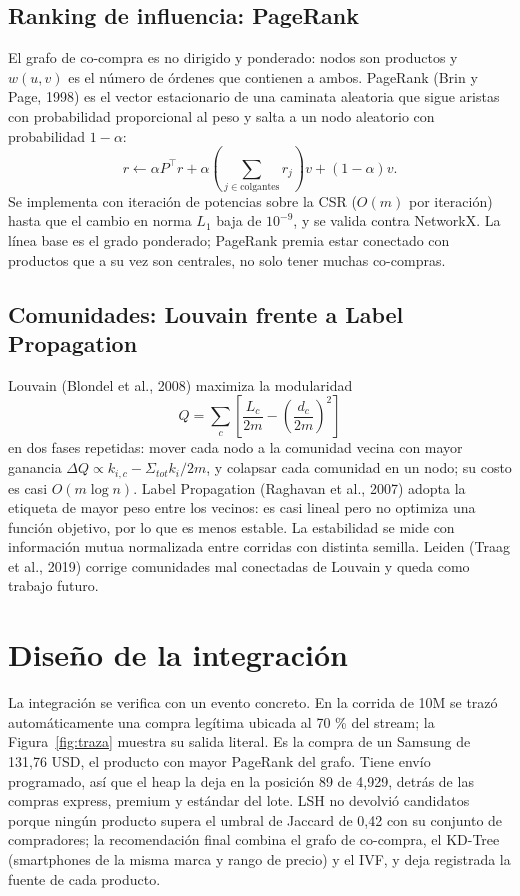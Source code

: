 \documentclass[11pt,letterpaper]{article}
\begin{document}
\subsection{Ranking de influencia: PageRank}
El grafo de co-compra es no dirigido y ponderado: nodos son productos y $w(u,v)$ es el n\'umero de \'ordenes que contienen a ambos. PageRank (Brin y Page, 1998) es el vector estacionario de una caminata aleatoria que sigue aristas con probabilidad proporcional al peso y salta a un nodo aleatorio con probabilidad $1-\alpha$:
\begin{equation}
r \leftarrow \alpha P^{\top} r + \alpha\left(\sum_{j \in \text{colgantes}} r_j\right) v + (1-\alpha)v .
\end{equation}
Se implementa con iteraci\'on de potencias sobre la CSR ($O(m)$ por iteraci\'on) hasta que el cambio en norma $L_1$ baja de $10^{-9}$, y se valida contra NetworkX. La l\'inea base es el grado ponderado; PageRank premia estar conectado con productos que a su vez son centrales, no solo tener muchas co-compras.

\subsection{Comunidades: Louvain frente a Label Propagation}
Louvain (Blondel et al., 2008) maximiza la modularidad
\begin{equation}
Q = \sum_c \left[\frac{L_c}{2m} - \left(\frac{d_c}{2m}\right)^2\right]
\end{equation}
en dos fases repetidas: mover cada nodo a la comunidad vecina con mayor ganancia $\Delta Q \propto k_{i,c} - \Sigma_{tot}k_i/2m$, y colapsar cada comunidad en un nodo; su costo es casi $O(m\log n)$. Label Propagation (Raghavan et al., 2007) adopta la etiqueta de mayor peso entre los vecinos: es casi lineal pero no optimiza una funci\'on objetivo, por lo que es menos estable. La estabilidad se mide con informaci\'on mutua normalizada entre corridas con distinta semilla. Leiden (Traag et al., 2019) corrige comunidades mal conectadas de Louvain y queda como trabajo futuro.

\section{Dise\~no de la integraci\'on}

La integraci\'on se verifica con un evento concreto. En la corrida de 10M se traz\'o autom\'aticamente una compra leg\'itima ubicada al 70 \% del stream; la Figura~\ref{fig:traza} muestra su salida literal. Es la compra de un Samsung de 131,76 USD, el producto con mayor PageRank del grafo. Tiene env\'io programado, as\'i que el heap la deja en la posici\'on 89 de 4,929, detr\'as de las compras express, premium y est\'andar del lote. LSH no devolvi\'o candidatos porque ning\'un producto supera el umbral de Jaccard de 0,42 con su conjunto de compradores; la recomendaci\'on final combina el grafo de co-compra, el KD-Tree (smartphones de la misma marca y rango de precio) y el IVF, y deja registrada la fuente de cada producto.
\end{document}

